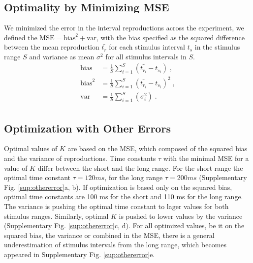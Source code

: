 \documentclass[10pt]{article}
\begin{document}
\subsection*{Optimality by Minimizing MSE}
We minimized the error in the interval reproductions across the experiment, we defined the $\text{MSE} = \text{bias}^2+\text{var}$, with the bias specified as the squared difference between the mean reproduction $\bar{t_{r}}$ for each stimulus interval $t_s$ in the stimulus range $S$ and variance as mean $\sigma^2$ for all stimulus intervals in $S$.
\begin{equation} \label{MSE}
	\begin{split}
	 \text{bias} & = \frac{1}{S} \sum \limits_{i=1}^{S} (\bar{t_{r_i}} - t_{s_i}) \;,\\
	 \text{bias}^2 & = \frac{1}{S} \sum \limits_{i=1}^{S}(\bar{t_{r_i}} - t_{s_i})^2 \;,\\
	 \text{var} & = \frac{1}{S} \sum \limits_{i=1}^{S}(\sigma_i^2) \;.\\
	\end{split}
\end{equation}

\subsection*{Optimization with Other Errors}
Optimal values of $K$ are based on the MSE, which composed of the squared bias and the variance of reproductions. 
Time constants $\tau$ with the minimal MSE for a value of $K$ differ between the short and the long range. For the short range the optimal time constant $\tau = 120 ms$, for the long range $\tau = 200 ms$ (Supplementary Fig. \ref{sup:othererror}a, b). If optimization is based only on the squared bias, optimal time constants are 100 ms for the short and 110 ms for the long range. 
The variance is pushing the optimal time constant to lager values for both stimulus ranges. 
Similarly, optimal $K$ is pushed to lower values by the variance (Supplementary Fig. \ref{sup:othererror}c, d).
For all optimized values, be it on the squared bias, the variance or combined in the MSE, there is a general underestimation of stimulus intervals from the long range, which becomes appeared in Supplementary Fig. \ref{sup:othererror}e.
\end{document}

